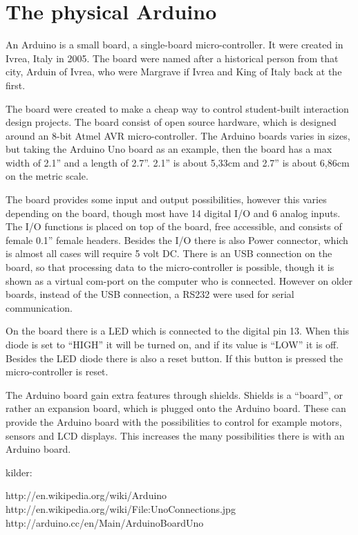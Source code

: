 \section{The physical Arduino}
An Arduino is a small board, a single-board micro-controller. It were created in Ivrea, Italy in 2005. The board were named after a historical person from that city, Arduin of Ivrea, who were Margrave if Ivrea and King of Italy back at the first. 

The board were created to make a cheap way to control student-built interaction design projects. The board consist of open source hardware, which is designed around an 8-bit Atmel AVR micro-controller. The Arduino boards varies in sizes, but taking the Arduino Uno board as an example, then the board has a max width of 2.1'' and a length of 2.7''. 2.1'' is about 5,33cm and 2.7'' is about 6,86cm on the metric scale. 

The board provides some input and output possibilities, however this varies depending on the board, though most have 14 digital I/O and 6 analog inputs. The I/O functions is placed on top of the board, free accessible, and consists of female 0.1'' female headers. Besides the I/O there is also Power connector, which is almost all cases will require 5 volt DC. There is an USB connection on the board, so that processing data to the micro-controller is possible, though it is shown as a virtual com-port on the computer who is connected. However on older boards, instead of the USB connection, a RS232 were used for serial communication. 

On the board there is a LED which is connected to the digital pin 13. When this diode is set to ``HIGH'' it will be turned on, and if its value is ``LOW'' it is off. Besides the LED diode there is also a reset button. If this button is pressed the micro-controller is reset. 

The Arduino board gain extra features through shields. Shields is a ``board'', or rather an expansion board, which is plugged onto the Arduino board. These can provide the Arduino board with the possibilities to control for example motors, sensors and LCD displays. This increases the many possibilities there is with an Arduino board. 

kilder:

http://en.wikipedia.org/wiki/Arduino
http://en.wikipedia.org/wiki/File:UnoConnections.jpg
http://arduino.cc/en/Main/ArduinoBoardUno

